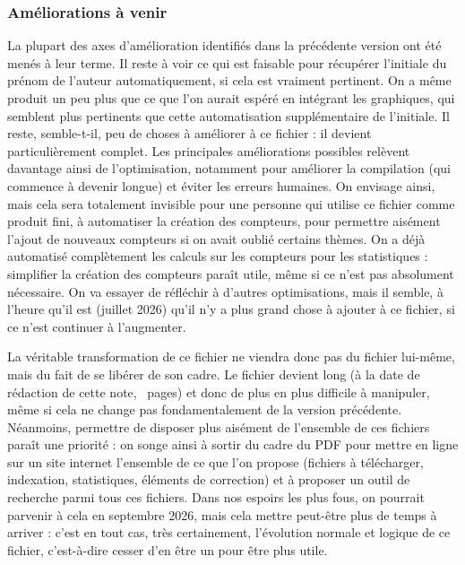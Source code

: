 \subsubsection{Améliorations à venir}

La plupart des axes d'amélioration identifiés dans la précédente version ont été menés à leur terme. Il reste à voir ce qui est faisable pour récupérer l'initiale du prénom de l'auteur automatiquement, si cela est vraiment pertinent. On a même produit un peu plus que ce que l'on aurait espéré en intégrant les graphiques, qui semblent plus pertinents que cette automatisation supplémentaire de l'initiale. Il reste, semble-t-il, peu de choses à améliorer à ce fichier : il devient particulièrement complet. Les principales améliorations possibles relèvent davantage ainsi de l'optimisation, notamment pour améliorer la compilation (qui commence à devenir longue) et éviter les erreurs humaines. On envisage ainsi, mais cela sera totalement invisible pour une personne qui utilise ce fichier comme produit fini, à automatiser la création des compteurs, pour permettre aisément l'ajout de nouveaux compteurs si on avait oublié certains thèmes. On a déjà automatisé complètement les calculs sur les compteurs pour les statistiques : simplifier la création des compteurs paraît utile, même si ce n'est pas absolument nécessaire. On va essayer de réfléchir à d'autres optimisations, mais il semble, à l'heure qu'il est (juillet 2026) qu'il n'y a plus grand chose à ajouter à ce fichier, si ce n'est continuer à l'augmenter.

La véritable transformation de ce fichier ne viendra donc pas du fichier lui-même, mais du fait de se libérer de son cadre. Le fichier devient long (à la date de rédaction de cette note, ~pages) et donc de plus en plus difficile à manipuler, même si cela ne change pas fondamentalement de la version précédente. Néanmoins, permettre de disposer plus aisément de l'ensemble de ces fichiers paraît une priorité : on songe ainsi à sortir du cadre du PDF pour mettre en ligne sur un site internet l'ensemble de ce que l'on propose (fichiers  à télécharger, indexation, statistiques, éléments de correction) et à proposer un outil de recherche parmi tous ces fichiers. Dans nos espoirs les plus fous, on pourrait parvenir à cela en septembre 2026, mais cela mettre peut-être plus de temps à arriver : c'est en tout cas, très certainement, l'évolution normale et logique de ce fichier, c'est-à-dire cesser d'en être un pour être plus utile.